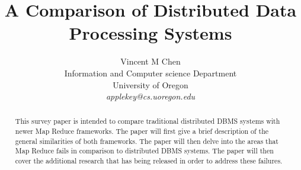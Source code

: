 \documentclass[10pt,twocolumn]{IEEEtran11}
\begin{document}


\title{\Large \bf A Comparison of Distributed Data Processing Systems}
\author{
Vincent M Chen\\
Information and Computer science Department\\
University of Oregon\\
{\em applekey@cs.uoregon.edu}
}
\maketitle

\begin{abstract}
	
	This survey paper is intended to compare traditional distributed DBMS systems with newer Map Reduce frameworks.    The paper will first give a brief description of the general similarities of both frameworks.  The paper will then delve into the areas that Map Reduce fails in comparison to distributed DBMS systems.  The paper will then cover the additional research that has being released in order to address these failures.
\end{abstract}
\end{document}
